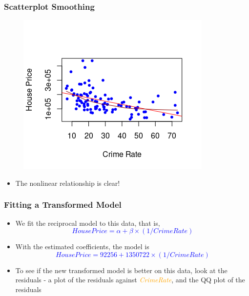 \documentclass[10pt]{beamer}
\theoremstyle{plain}
\begin{document}
\begin{frame}
\frametitle{\sc Scatterplot Smoothing}
    \begin{figure}[!ht]
		\centering
		\includegraphics[scale=0.8]{figs8/scatter-smooth.png}
	\end{figure}
\begin{itemize}
\item The nonlinear relationship is clear!
\end{itemize}
\end{frame}

\begin{frame}
\frametitle{\sc Fitting a Transformed Model}
	\begin{itemize}
	\item We fit the reciprocal model to this data, that is, 
\textcolor{blue}{\[
HousePrice = \alpha + \beta \times (1/CrimeRate)
\]}
	\item With the estimated coefficients, the model is 
\textcolor{blue}{\[
HousePrice  = 92256 + 1350722 \times (1/CrimeRate)
\]}
	\item To see if the new transformed model is better on this data, look at the residuals - a plot of the residuals against \textcolor{orange}{\textit{CrimeRate}}, and the QQ plot of the residuals
	\end{itemize}
\end{frame}
\end{document}
